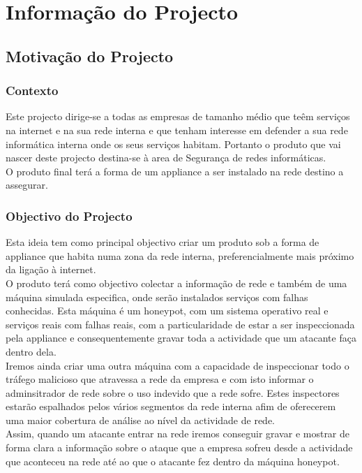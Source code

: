 \chapter{Informação do Projecto}
\section{Motivação do Projecto}
\subsection{Contexto}
Este projecto dirige-se a todas as empresas de tamanho médio que teêm serviços na internet e na sua rede interna e que
tenham interesse em defender a sua rede informática interna onde os seus serviços habitam.
Portanto o produto que vai nascer deste projecto destina-se à area de Segurança de redes informáticas.\\
O produto final terá a forma de um appliance a ser instalado na rede destino a assegurar.


\subsection{Objectivo do Projecto}
Esta ideia tem como principal objectivo criar um produto sob a forma de appliance
que habita numa zona da rede interna, preferencialmente mais próximo da ligação à internet.\\
O produto terá como objectivo colectar a informação de rede e também de uma máquina simulada especifica, onde serão instalados serviços com falhas conhecidas.
Esta máquina é um honeypot, com um sistema operativo real e serviços reais com falhas reais, com a particularidade de estar a ser inspeccionada
pela appliance e consequentemente gravar toda a actividade que um atacante faça dentro dela.\\
Iremos ainda criar uma outra máquina com a capacidade de inspeccionar todo o tráfego malicioso que atravessa a rede da empresa e com isto informar o
adminsitrador de rede sobre o uso indevido que a rede sofre. Estes inspectores estarão espalhados pelos vários segmentos da rede interna afim de 
oferecerem uma maior cobertura de análise ao nível da actividade de rede.\\
Assim, quando um atacante entrar na rede iremos conseguir gravar e mostrar de forma clara a informação sobre o ataque que a empresa sofreu desde a actividade
que aconteceu na rede até ao que o atacante fez dentro da máquina honeypot.\\

